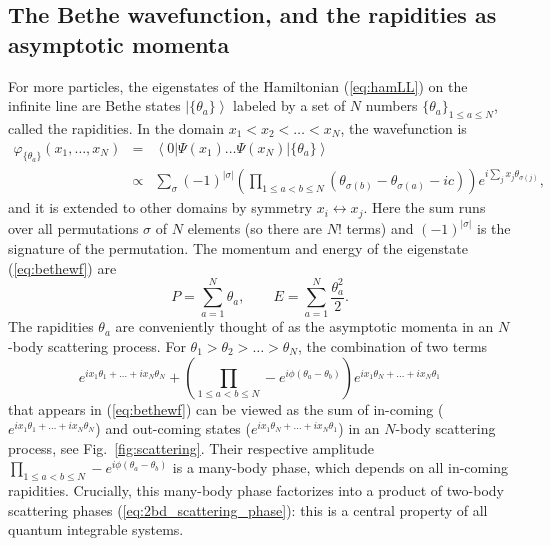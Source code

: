 \documentclass[onecolumn,amsfonts,showpacs,superscriptaddress]{revtex4-1}
\begin{document}
\subsection{The Bethe wavefunction, and the rapidities as asymptotic momenta}
\label{subsec:asymptotic_momenta}

For more particles, the eigenstates of the Hamiltonian (\ref{eq:hamLL}) on the infinite line are Bethe states  $\left| \{\theta_a\} \right>$ labeled by a set of $N$ numbers $\{ \theta_a\}_{1 \leq a \leq N}$, called the rapidities. In the domain $x_1<x_2< \dots < x_N$, the wavefunction is~\citep{lieb1963exact,korepin1997quantum,gaudin2014bethe}
\begin{eqnarray}
	\label{eq:bethewf}
	\varphi_{\{ \theta_a \} }(x_1,\dots, x_N) & = & \left< 0 \right| \Psi(x_1) \dots \Psi(x_N) \left| \{\theta_a\} \right> \\
\nonumber	&\propto &  \sum_\sigma (-1)^{|\sigma |}  \left(\prod_{1 \leq a<b\leq N} (\theta_{\sigma (b)} - \theta_{\sigma (a)} - i c )\right) e^{i \sum_{j} x_j  \theta_{\sigma (j)}  } ,
\end{eqnarray}
and it is extended to other domains by symmetry $x_i \leftrightarrow x_j$. Here the sum runs over all permutations $\sigma$ of $N$ elements (so there are $N!$ terms) and $(-1)^{|\sigma|}$ is the signature of the permutation. The momentum and energy of the eigenstate (\ref{eq:bethewf}) are
\begin{equation}
    \label{eq:thetaPE}
    P = \sum_{a=1}^N \theta_a , \qquad  E = \sum_{a=1}^N \frac{\theta_a^2}{2} .
\end{equation}
The rapidities $\theta_a$ are  conveniently thought of as the  asymptotic momenta in an $N$-body scattering process. For $\theta_1 > \theta_2 > \dots > \theta_N$, the combination of two terms
\begin{equation}
    e^{i x_1 \theta_1 + \dots + i x_N \theta_N} + \left( \prod_{1 \leq a < b \leq N} -e^{i \phi(\theta_a - \theta_b) } \right) e^{i x_1 \theta_N + \dots + i x_N \theta_1} 
\end{equation}
that appears in (\ref{eq:bethewf}) can be viewed as the sum of in-coming ($e^{i x_1 \theta_1 + \dots + i x_N \theta_N}$) and out-coming states ($e^{i x_1 \theta_N + \dots + i x_N \theta_1}$) in an $N$-body scattering process, see Fig.~\ref{fig:scattering}. Their respective amplitude $\prod_{1 \leq a < b \leq N} -e^{i \phi(\theta_a - \theta_b) }$ is a many-body phase, which depends on all in-coming rapidities. Crucially, this many-body phase factorizes into a product of two-body scattering phases (\ref{eq:2bd_scattering_phase}): this is a central property of all quantum integrable systems.
\end{document}
